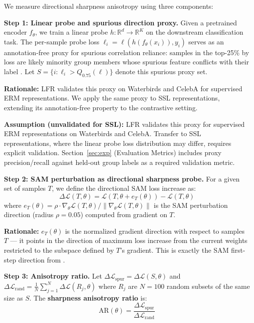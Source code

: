 We measure directional sharpness anisotropy using three components:

\textbf{Step 1: Linear probe and spurious direction proxy.}
Given a pretrained encoder $f_\theta$, we train a linear probe $h: \mathbb{R}^d \to \mathbb{R}^K$ on the downstream classification task. The per-sample probe loss $\ell_i = \ell(h(f_\theta(x_i)), y_i)$ serves as an annotation-free proxy for spurious correlation reliance: samples in the top-25\% by loss are likely minority group members whose spurious feature conflicts with their label \citep{ghaznavi2023lfr}. Let $S = \{i : \ell_i > Q_{0.75}(\ell)\}$ denote this spurious proxy set.

\textbf{Rationale:} LFR \citep{ghaznavi2023lfr} validates this proxy on Waterbirds and CelebA for supervised ERM representations. We apply the same proxy to SSL representations, extending its annotation-free property to the contrastive setting.

\textbf{Assumption (unvalidated for SSL):} LFR \citep{ghaznavi2023lfr} validates this proxy for supervised ERM representations on Waterbirds and CelebA. Transfer to SSL representations, where the linear probe loss distribution may differ, requires explicit validation. Section~\ref{sec:exp} (Evaluation Metrics) includes proxy precision/recall against held-out group labels as a required validation metric.

\textbf{Step 2: SAM perturbation as directional sharpness probe.}
For a given set of samples $T$, we define the directional SAM loss increase as:
\begin{equation}
\Delta\mathcal{L}(T, \theta) = \mathcal{L}(T, \theta + e_T(\theta)) - \mathcal{L}(T, \theta)
\end{equation}
where $e_T(\theta) = \rho \cdot \nabla_\theta \mathcal{L}(T, \theta) / \|\nabla_\theta \mathcal{L}(T, \theta)\|$ is the SAM perturbation direction (radius $\rho = 0.05$) computed from gradient on $T$.

\textbf{Rationale:} $e_T(\theta)$ is the normalized gradient direction with respect to samples $T$ --- it points in the direction of maximum loss increase from the current weights restricted to the subspace defined by $T$'s gradient. This is exactly the SAM first-step direction from \citet{davda54sam2021}.

\textbf{Step 3: Anisotropy ratio.}
Let $\Delta\mathcal{L}_{\text{spur}} = \Delta\mathcal{L}(S, \theta)$ and $\Delta\mathcal{L}_{\text{rand}} = \frac{1}{N}\sum_{j=1}^{N}\Delta\mathcal{L}(R_j, \theta)$ where $R_j$ are $N=100$ random subsets of the same size as $S$. The \textbf{sharpness anisotropy ratio} is:
\begin{equation}
\text{AR}(\theta) = \frac{\Delta\mathcal{L}_{\text{spur}}}{\Delta\mathcal{L}_{\text{rand}}}
\end{equation}

